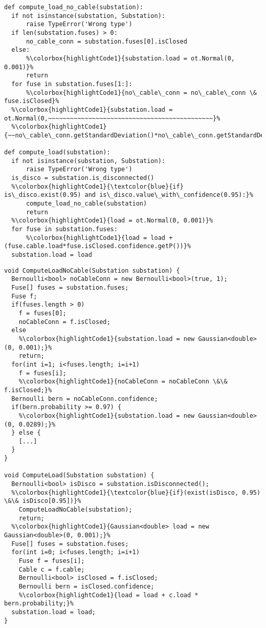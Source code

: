 \begin{lstlisting}[style=pythonStyle, caption={Excerpt of the OpenTurns implementation (Python)}, label=lst:valid-expr-python, linewidth=0.97\textwidth, escapechar=\%]
def compute_load_no_cable(substation):
  if not isinstance(substation, Substation):
      raise TypeError('Wrong type')
  if len(substation.fuses) > 0:
      no_cable_conn = substation.fuses[0].isClosed
  else:
      %\colorbox{highlightCode1}{substation.load = ot.Normal(0, 0.001)}%
      return
  for fuse in substation.fuses[1:]:
      %\colorbox{highlightCode1}{no\_cable\_conn = no\_cable\_conn \& fuse.isClosed}%
  %\colorbox{highlightCode1}{substation.load = ot.Normal(0,~~~~~~~~~~~~~~~~~~~~~~~~~~~~~~~~~~~~~~~~~~~~~}%
  %\colorbox{highlightCode1}{~~no\_cable\_conn.getStandardDeviation()*no\_cable\_conn.getStandardDeviation())}%

def compute_load(substation):
  if not isinstance(substation, Substation):
      raise TypeError('Wrong type')
  is_disco = substation.is_disconnected()
  %\colorbox{highlightCode1}{\textcolor{blue}{if} is\_disco.exist(0.95) and is\_disco.value\_with\_confidence(0.95):}%
      compute_load_no_cable(substation)
      return
  %\colorbox{highlightCode1}{load = ot.Normal(0, 0.001)}%
  for fuse in substation.fuses:
      %\colorbox{highlightCode1}{load = load + (fuse.cable.load*fuse.isClosed.confidence.getP())}%
  substation.load = load	
\end{lstlisting}

\begin{lstlisting}[style=uMiniJavaStyle, caption={Excerpt of the \languageName{} implementation}, label=lst:valid-expruscript, linewidth=0.97\textwidth, escapechar=\%]
void ComputeLoadNoCable(Substation substation) {
  Bernoulli<bool> noCableConn = new Bernoulli<bool>(true, 1);
  Fuse[] fuses = substation.fuses;
  Fuse f;
  if(fuses.length > 0) 
    f = fuses[0];
    noCableConn = f.isClosed;
  else
    %\colorbox{highlightCode1}{substation.load = new Gaussian<double>(0, 0.001);}%
    return;
  for(int i=1; i<fuses.length; i=i+1)
    f = fuses[i];
    %\colorbox{highlightCode1}{noCableConn = noCableConn \&\& f.isClosed;}%
  Bernoulli bern = noCableConn.confidence;
  if(bern.probability >= 0.97) {
    %\colorbox{highlightCode1}{substation.load = new Gaussian<double>(0, 0.0289);}%
  } else {
    [...]
  }
}

void ComputeLoad(Substation substation) {
  Bernoulli<bool> isDisco = substation.isDisconnected();
  %\colorbox{highlightCode1}{\textcolor{blue}{if}(exist(isDisco, 0.95) \&\& isDisco[0.95])}%
    ComputeLoadNoCable(substation);
    return;
  %\colorbox{highlightCode1}{Gaussian<double> load = new Gaussian<double>(0, 0.001);}%
  Fuse[] fuses = substation.fuses;
  for(int i=0; i<fuses.length; i=i+1)
    Fuse f = fuses[i];
    Cable c = f.cable;
    Bernoulli<bool> isClosed = f.isClosed;
    Bernoulli bern = isClosed.confidence;
    %\colorbox{highlightCode1}{load = load + c.load * bern.probability;}%
  substation.load = load;
}
\end{lstlisting}


